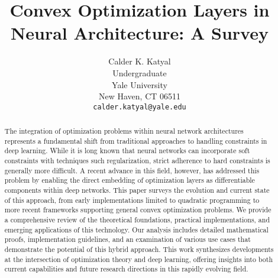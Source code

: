 \documentclass{article}
\title{Convex Optimization Layers in Neural Architecture: A Survey}
\author{%
  Calder K. Katyal\\
  Undergraduate\\
  Yale University\\
  New Haven, CT 06511 \\
  \texttt{calder.katyal@yale.edu} \\
}
\begin{document}
\maketitle

\begin{abstract}
    The integration of optimization problems within neural network architectures represents a fundamental shift from traditional approaches to handling constraints in deep learning. While it is long known that neural networks can incorporate soft constraints with techniques such regularization, strict adherence to hard constraints is generally more difficult. A recent advance in this field, however, has addressed this problem by enabling the direct embedding of optimization layers as differentiable components within deep networks. This paper surveys the evolution and current state of this approach, from early implementations limited to quadratic programming to more recent frameworks supporting general convex optimization problems. We provide a comprehensive review of the theoretical foundations, practical implementations, and emerging applications of this technology. Our analysis includes detailed mathematical proofs, implementation guidelines, and an examination of various use cases that demonstrate the potential of this hybrid approach. This work synthesizes developments at the intersection of optimization theory and deep learning, offering insights into both current capabilities and future research directions in this rapidly evolving field. 
\end{abstract}
\end{document}
